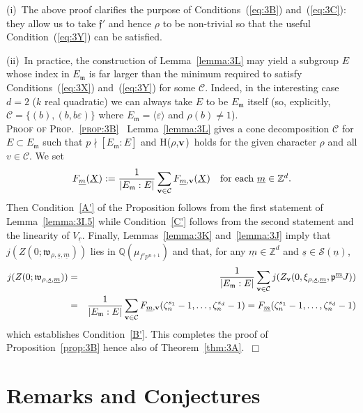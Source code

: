 \documentclass[12pt]{article}
\newcounter{rem}[section]%
\newcommand{\bbQ}{\ensuremath{\mathbb{Q}}}
\newcommand{\bbZ}{\ensuremath{\mathbb{Z}}}
\newcommand{\bv}{\ensuremath{{\bf v}}}
\newcommand{\cC}{\ensuremath{\mathcal{C}}}
\newcommand{\cS}{\ensuremath{\mathcal{S}}}
\newcommand{\ePf}{\hspace*{\fill}~$\Box$\vertsp\par}%
\newcommand{\ff}{\ensuremath{\mathfrak{f}}}
\newcommand{\fm}{\ensuremath{\mathfrak{m}}}
\newcommand{\fp}{\ensuremath{\mathfrak{p}}}
\newcommand{\fw}{\ensuremath{\mathfrak{w}}}
\newcommand{\ndiv}{\nmid}
\newcommand{\refeq}[1]{~(\ref{eq:#1})}
\newcommand{\rem}{\refstepcounter{rem}\noindent{\sc Remark \therem}}%
\renewcommand{\therem}{\thesection.\arabic{rem}}
\newcommand{\vertsp}{\vspace{1ex}}
\newcommand{\Hrhov}{H($\rho$,$\bv$)}
\newcommand{\um}{\ensuremath{{\underline{m}}}}
\newcommand{\un}{\ensuremath{{\underline{n}}}}
\newcommand{\ur}{\ensuremath{{\underline{r}}}}
\newcommand{\us}{\ensuremath{{\underline{s}}}}
\newcommand{\uX}{\ensuremath{{\underline{X}}}}
\begin{document}
(i)~The above proof clarifies the purpose of
Conditions\refeq{3B} and\refeq{3C}: they allow
us to take $\ff'$ and hence $\rho$ to be non-trivial so that
the useful Condition\refeq{3Y} can be satisfied.

(ii)~In practice, the construction of Lemma~\ref{lemma:3L} may yield a subgroup $E$
whose index in $E_\fm$ is far larger than the minimum required to satisfy
Conditions\refeq{3X} and\refeq{3Y} for some $\cC$. Indeed,
in the interesting case $d=2$ ($k$ real quadratic) we can always take
$E$ to be $E_\fm$ itself (so, explicitly, $\cC=\{(b), (b,b\varepsilon)\}$ where
$E_\fm=\langle\varepsilon\rangle$ and $\rho(b)\neq 1$).
\vertsp\\
\noindent \textsc{Proof of Prop.~\ref{prop:3B} }\
Lemma~\ref{lemma:3L} gives a cone decomposition $\cC$ for $E\subset E_\fm$
such that
$
p\ndiv[E_\fm:E]
$
and \Hrhov\ holds for the given character $\rho$ and all $v\in\cC$.
We set
\[
F_\um(\uX):=\frac{1}{|E_\fm:E|}\sum_{\bv\in \cC}F_{\um,\bv}(\uX)\ \ \ \mbox{for each $\um\in\bbZ^d$.}
\]
Then
Condition~\ref{A'} of the Proposition follows from the first statement
of Lemma~\ref{lemma:3I.5} while
Condition~\ref{C'} follows from the second statement and the linearity of $V_{\ur}$.
Finally, Lemmas~\ref{lemma:3K} and~\ref{lemma:3J} imply that
$j(Z(0;\fw_{\rho,\us,\um}))$ lies in $\bbQ(\mu_{f'p^{n+1}})$ and that,
for any $\um\in\bbZ^d$ and $\us\in\cS(\un)$,
\begin{eqnarray*}
j(Z(0;\fw_{\rho,\us,\um}))&=&
\frac{1}{|E_\fm:E|}\sum_{\bv\in\cC}
j(Z_{\bv}(0,\xi_{\rho,\us,\um},\fp^\um J))\\
&=&\frac{1}{|E_\fm:E|}\sum_{\bv\in\cC}
F_{\um,\bv}(\zeta_n^{s_1}-1,\ldots,\zeta_n^{s_d}-1)
=F_{\um}(\zeta_n^{s_1}-1,\ldots,\zeta_n^{s_d}-1)
\end{eqnarray*}
which establishes
Condition~\ref{B'}. This completes the proof of Proposition~\ref{prop:3B}
hence also of Theorem~\ref{thm:3A}.\ePf
\section{Remarks and Conjectures}
\end{document}
